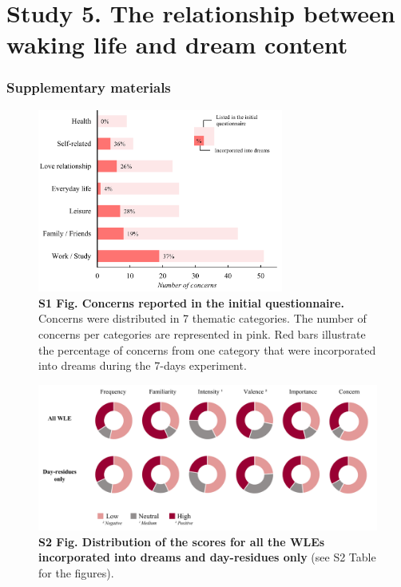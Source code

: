 \cleardoublepage

\chapter{Study 5. The relationship between waking life and dream content}
\label{res:wle}

\cleardoublepage



\cleardoublepage

\subsection*{Supplementary materials}
\label{res:wle:supp}
\vspace*{1cm}

\begin{figure}[htbp]
	\includegraphics[width=0.72\textwidth]{Fig/Results/WLE/S1_Fig.png}
	\caption*{\textbf{S1 Fig. Concerns reported in the initial questionnaire.} Concerns were distributed in 7 thematic categories. The number of concerns per categories are represented in pink. Red bars illustrate the percentage of concerns from one category that were incorporated into dreams during the 7-days experiment.}
\end{figure}

\vspace*{3cm}

\begin{figure}[htbp]
	\includegraphics[width=\textwidth]{Fig/Results/WLE/S2_Fig.png}
	\caption*{\textbf{S2 Fig. Distribution of the scores for all the WLEs incorporated into dreams and day-residues only} (see S2 Table for the figures).}
\end{figure}

